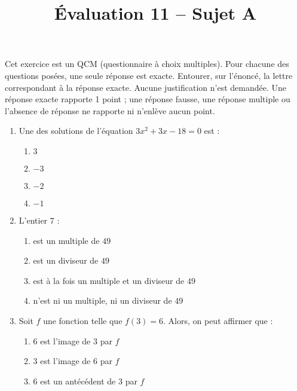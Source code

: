 \documentclass[a4paper,dvipsnames]{article}
\begin{document}
\title{Évaluation 11 -- Sujet A}
\author{}
\date{}

\maketitle{}

\pagestyle{empty}
\thispagestyle{empty}

\exo[4 points] Cet exercice est un QCM (questionnaire à choix multiples). Pour chacune des questions posées, une seule réponse est exacte. Entourer, sur l'énoncé, la lettre correspondant à la réponse exacte. Aucune justification n'est demandée. Une réponse exacte rapporte 1 point ; une réponse fausse, une réponse multiple ou l'absence de réponse ne rapporte ni n'enlève aucun point.

\begin{enumerate}
  \item Une des solutions de l'équation $3x^2+3x-18=0$ est :
    \vspace{-3mm}
    \begin{multicols}{4}
      \begin{enumerate}
	\item $3$
	\item $-3$
	\item $-2$
	\item $-1$
      \end{enumerate} 
    \end{multicols}
  \item L'entier $7$ :
    \vspace{-3mm}
    \begin{multicols}{4}
      \begin{enumerate}
	\item est un multiple de $49$
	\item est un diviseur de $49$
	\item est à la fois un multiple et un diviseur de $49$
	\item n'est ni un multiple, ni un diviseur de $49$
      \end{enumerate} 
    \end{multicols}
  \item Soit $f$ une fonction telle que $f(3)=6$. Alors, on peut affirmer que :
    \begin{multicols}{4}
      \begin{enumerate}
	\item $6$ est l'image de $3$ par $f$
	\item $3$ est l'image de $6$ par $f$
	\item $6$ est un antécédent de $3$ par $f$

\end{enumerate}
\end{multicols}
\end{enumerate}
\end{document}
